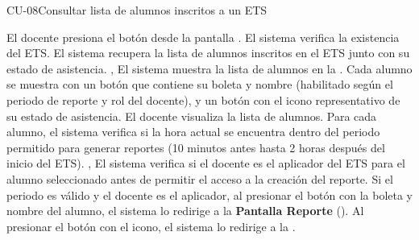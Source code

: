 \begin{UseCase}{CU-08}{Consultar lista de alumnos inscritos a un ETS}
{	}
\end{UseCase}
\begin{UCtrayectoria}
	\UCpaso[\UCactor] El docente presiona el botón  desde la pantalla .
	\UCpaso El sistema verifica la existencia del ETS. 
	\UCpaso El sistema recupera la lista de alumnos inscritos en el ETS junto con su estado de asistencia. , 
	\UCpaso El sistema muestra la lista de alumnos en la . Cada alumno se muestra con un botón que contiene su boleta y nombre (habilitado según el periodo de reporte y rol del docente), y un botón con el icono representativo de su estado de asistencia.
	\UCpaso[\UCactor] El docente visualiza la lista de alumnos.
	\UCpaso Para cada alumno, el sistema verifica si la hora actual se encuentra dentro del periodo permitido para generar reportes (10 minutos antes hasta 2 horas después del inicio del ETS). , 
	\UCpaso El sistema verifica si el docente es el aplicador del ETS para el alumno seleccionado antes de permitir el acceso a la creación del reporte. 
	\UCpaso[\UCactor] Si el periodo es válido y el docente es el aplicador, al presionar el botón con la boleta y nombre del alumno, el sistema lo redirige a la \textbf{Pantalla Reporte} ().
	\UCpaso[\UCactor] Al presionar el botón con el icono, el sistema lo redirige a la .
\end{UCtrayectoria}

